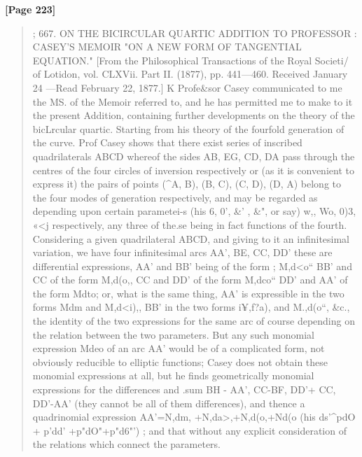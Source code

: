\documentclass[11pt,a4paper]{book}
\begin{document}
\textbf{[Page 223]}\\[0.2cm]
\begin{quote}
;
667.
ON THE BICIRCULAR QUARTIC ADDITION TO PROFESSOR
:
CASEY'S MEMOIR "ON A NEW FORM OF TANGENTIAL
EQUATION."
[From the Philosophical Transactions of the Royal Societi/ of Lotidon, vol. CLXVii.
Part II. (1877), pp. 441---460. Received January 24 ---Read February 22, 1877.]
K
Profe\&sor Casey communicated to me the MS. of the Memoir referred to, and he
has permitted me to make to it the present Addition, containing further developments
on the theory of the bicLrcular quartic.
Starting from his theory of the fourfold generation of the curve. Prof Casey
shows that there exist series of inscribed quadrilaterals ABCD whereof the sides AB,
EG, CD, DA pass through the centres of the four circles of inversion respectively
or (as it is convenient to express it) the pairs of points (\textasciicircum{}A, B), (B, C), (C, D), (D, A)
belong to the four modes of generation respectively, and may be regarded as depending
upon certain parametei-s (his 6, 0', \&' , \&", or say) w,, Wo, 0)3, «<j respectively, any
three of the.se being in fact functions of the fourth. Considering a given quadrilateral
ABCD, and giving to it an infinitesimal variation, we have four infinitesimal arcs
AA', BE, CC, DD' these are differential expressions, AA' and BB' being of the form
;
M,d<o`` BB' and CC of the form M,d(o,, CC and DD' of the form M,dco`` DD' and
AA' of the form Mdto; or, what is the same thing, AA' is expressible in the two
forms Mdm and M,d<i),, BB' in the two forms i¥,f?a), and M.,d(o``, \&c., the identity of
the two expressions for the same arc of course depending on the relation between
the two parameters. But any such monomial expression Mdeo of an arc AA' would
be of a complicated form, not obviously reducible to elliptic functions; Casey does
not obtain these monomial expressions at all, but he finds geometrically monomial
expressions for the differences and .sum BH - AA', CC-BF, DD'+ CC, DD'-AA'
(they cannot be all of them differences), and thence a quadrinomial expression
AA'=N,dm, +N,da>,+N,d(o,+Nd(o (his ds'\textasciicircum{}pdO + p'dd' +p"dO"+p"d6"') ; and that
without any explicit consideration of the relations which connect the parameters.
\end{quote}
\end{document}
